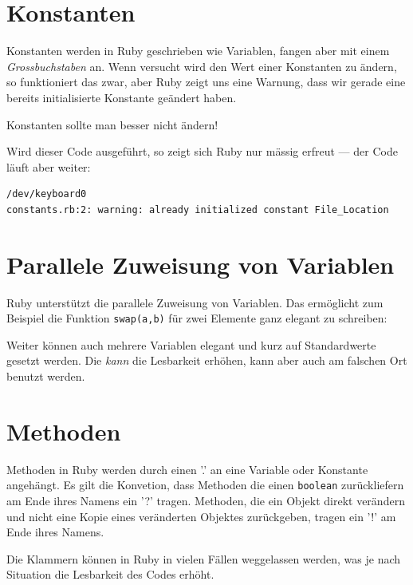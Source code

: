 \documentclass[a4book,11pt,twoside]{scrbook}
\begin{document}
\section{Konstanten} %
\label{sec:konstanten}
Konstanten werden in Ruby geschrieben wie Variablen, fangen aber mit einem \emph{Grossbuchstaben} an. Wenn versucht wird den Wert einer Konstanten zu ändern, so funktioniert das zwar, aber Ruby zeigt uns eine Warnung, dass wir gerade eine bereits initialisierte Konstante geändert haben.

Konstanten sollte man besser nicht ändern!



Wird dieser Code ausgeführt, so zeigt sich Ruby nur mässig erfreut — der Code läuft aber weiter:
\begin{lstlisting}
/dev/keyboard0
constants.rb:2: warning: already initialized constant File_Location
\end{lstlisting}





\section{Parallele Zuweisung von Variablen}
Ruby unterstützt die parallele Zuweisung von Variablen. Das ermöglicht zum Beispiel die Funktion \texttt{swap(a,b)} für zwei Elemente ganz elegant zu schreiben:



Weiter können auch mehrere Variablen elegant und kurz auf Standardwerte gesetzt werden. Die \emph{kann} die Lesbarkeit erhöhen, kann aber auch am falschen Ort benutzt werden.








\section{Methoden} %
\label{sec:methoden}
Methoden in Ruby werden durch einen '.' an eine Variable oder Konstante angehängt. Es gilt die Konvetion, dass Methoden die einen \texttt{boolean} zurückliefern am Ende ihres Namens ein '?' tragen. Methoden, die ein Objekt direkt verändern und nicht eine Kopie eines veränderten Objektes zurückgeben, tragen ein '!' am Ende ihres Namens.

Die Klammern können in Ruby in vielen Fällen weggelassen werden, was je nach Situation die Lesbarkeit des Codes erhöht.
\end{document}
